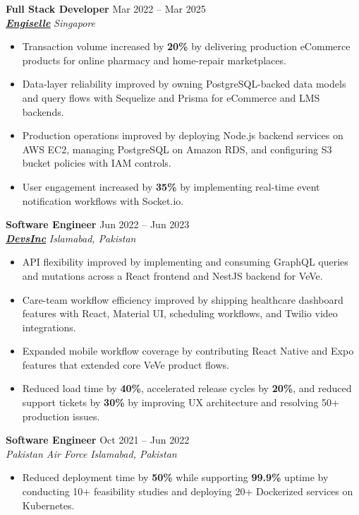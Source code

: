 \documentclass[9pt,letterpaper]{article}
\newcommand{\role}[4]{\textbf{#1} \hfill #2 \\
\textit{#3} \hfill \textit{#4}\\[-4pt]}
\begin{document}
\role{Full Stack Developer}{Mar 2022 -- Mar 2025}{\href{https://www.engiselle.com/}{\textbf{\underline{Engiselle}}}}{Singapore}
\begin{itemize}[leftmargin=*, itemsep=0pt, topsep=0pt, partopsep=0pt, parsep=0pt, after=\vspace{2pt}]
  \item Transaction volume increased by \textbf{20\%} by delivering production eCommerce products for online pharmacy and home-repair marketplaces.
  \item Data-layer reliability improved by owning PostgreSQL-backed data models and query flows with Sequelize and Prisma for eCommerce and LMS backends.
  \item Production operations improved by deploying Node.js backend services on AWS EC2, managing PostgreSQL on Amazon RDS, and configuring S3 bucket policies with IAM controls.
  \item User engagement increased by \textbf{35\%} by implementing real-time event notification workflows with Socket.io.
\end{itemize}

\role{Software Engineer}{Jun 2022 -- Jun 2023}{\href{https://www.devsinc.com/}{\textbf{\underline{DevsInc}}}}{Islamabad, Pakistan}
\begin{itemize}[leftmargin=*, itemsep=0pt, topsep=0pt, partopsep=0pt, parsep=0pt, after=\vspace{2pt}]
  \item API flexibility improved by implementing and consuming GraphQL queries and mutations across a React frontend and NestJS backend for VeVe.
  \item Care-team workflow efficiency improved by shipping healthcare dashboard features with React, Material UI, scheduling workflows, and Twilio video integrations.
  \item Expanded mobile workflow coverage by contributing React Native and Expo features that extended core VeVe product flows.
  \item Reduced load time by \textbf{40\%}, accelerated release cycles by \textbf{20\%}, and reduced support tickets by \textbf{30\%} by improving UX architecture and resolving 50+ production issues.
\end{itemize}

\role{Software Engineer}{Oct 2021 -- Jun 2022}{Pakistan Air Force}{Islamabad, Pakistan}
\begin{itemize}[leftmargin=*, itemsep=0pt, topsep=0pt, partopsep=0pt, parsep=0pt, after=\vspace{2pt}]
  \item Reduced deployment time by \textbf{50\%} while supporting \textbf{99.9\%} uptime by conducting 10+ feasibility studies and deploying 20+ Dockerized services on Kubernetes.
\end{itemize}
\end{document}
